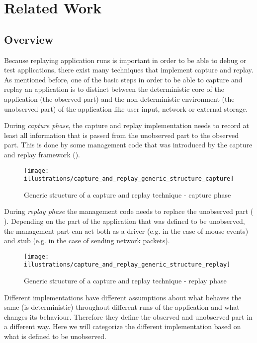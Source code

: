 \chapter{Related Work}
\section{Overview}
Because replaying application runs is important in order to be able to debug or test applications, there exist many techniques that implement capture and replay. As mentioned before, one of the basic steps in order to be able to capture and replay an application is to distinct between the deterministic core of the application (the observed part) and the non-deterministic environment (the unobserved part) of the application like user input, network or external storage.

During \emph{capture phase}, the capture and replay implementation needs to record at least all information that is passed from the unobserved part to the observed part. This is done by some management code that was introduced by the capture and replay framework ().
\begin{figure}[h]
  \centering
  \texttt{[image: illustrations/capture\_and\_replay\_generic\_structure\_capture]}
  \caption{Generic structure of a capture and replay technique - capture phase}
  \label{fig:GenericCrStructure_capture}
\end{figure}

During \emph{replay phase} the management code needs to replace the unobserved part ( 
). Depending on the part of the application that was defined to be unobserved, the management part can act both as a driver (e.g. in the case of mouse events) and stub (e.g. in the case of sending network packets). 
\begin{figure}[h]
  \centering
  \texttt{[image: illustrations/capture\_and\_replay\_generic\_structure\_replay]}
  \caption{Generic structure of a capture and replay technique - replay phase}
  \label{fig:GenericCrStructure_replay}
\end{figure}

Different implementations have different assumptions about what behaves the same (is deterministic) throughout different runs of the application and what changes its behaviour. Therefore they define the observed and unobserved part in a different way. Here we will categorize the different implementation based on what is defined to be unobserved.

